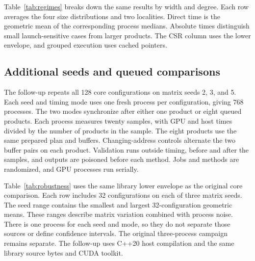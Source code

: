 \documentclass[10pt]{article}
\begin{document}
\begin{table}[H]
\centering\small
\caption{Core-grid ratios over 128 configurations and three process observations
per configuration. Minima and wins use GPU ratios averaged in log space across
processes. Changing-address grouped execution is paired with changing-address
direct execution.}\label{tab:core}

\end{table}



Table~\ref{tab:regimes} breaks down the same results by width and degree. Each row averages the four size distributions and two
localities. Direct time is the geometric mean of the corresponding process
medians. Absolute times distinguish small launch-sensitive cases from larger
products. The CSR column uses the lower envelope, and grouped execution uses
cached pointers.



\subsection{Additional seeds and queued comparisons}
The follow-up repeats all 128 core configurations on matrix seeds 2, 3,
and 5. Each seed and timing mode uses one fresh process per configuration,
giving 768 processes. The two modes synchronize after either one product
or eight queued products. Each process measures twenty samples, with GPU
and host times divided by the number of products in the sample. The eight
products use the same prepared plan and buffers. Changing-address controls
alternate the two buffer pairs on each product. Validation runs outside
timing, before and after the samples, and outputs are poisoned before each
method. Jobs and methods are randomized, and GPU processes run serially.

Table~\ref{tab:robustness} uses the same library lower envelope as the
original core comparison. Each row includes 32 configurations on each of
three matrix seeds. The seed range contains the smallest and largest
32-configuration geometric means. These ranges describe matrix variation
combined with process noise. There is one process for each seed and mode,
so they do not separate those sources or define confidence intervals.
The original three-process campaign remains separate. The follow-up uses
C++20 host compilation and the same library source bytes and CUDA toolkit.

\begin{table}[H]
\centering\small
\caption{Additional matrix seeds and synchronization intervals for the NVIDIA controls. Ratios divide
comparator time by direct time, so values above one favor direct execution.
Batch is the number of products queued before synchronization. Wins compare
direct execution with the fastest tested library for each of 96 instances.}
\label{tab:robustness}

\end{table}
\end{document}
